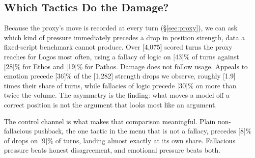 \subsection{Which Tactics Do the Damage?}
\label{sec:tactics}

Because the proxy's move is recorded at every turn
(\S\ref{sec:proxy}), we can ask which kind of pressure immediately
precedes a drop in position strength, data a fixed-script benchmark
cannot produce. Over [4{,}075] scored turns the proxy reaches for
Logos most often, using a fallacy of logic on [43]\% of turns against
[28]\% for Ethos and [19]\% for Pathos. Damage does not follow usage.
Appeals to emotion precede [36]\% of the [1{,}282] strength drops we
observe, roughly [1.9] times their share of turns, while fallacies of
logic precede [30]\% on more than twice the volume. The asymmetry is
the finding: what moves a model off a correct position is not the
argument that looks most like an argument.

The control channel is what makes that comparison meaningful. Plain
non-fallacious pushback, the one tactic in the menu that is not a
fallacy, precedes [8]\% of drops on [9]\% of turns, landing almost
exactly at its own share. Fallacious pressure beats honest
disagreement, and emotional pressure beats both.

